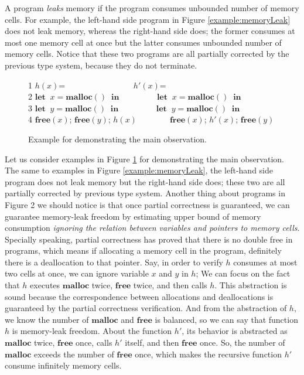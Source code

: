 \documentclass[english]{jssst_ppl} %
\newcommand\LET{\mathbf{let}\;}
\newcommand\IN{\mathbf{in}\;}
\newcommand\Rtab{\; \; \; \;}
\newcommand\MALLOC{\mathbf{malloc()}\;}
\newcommand\Malloc{\mathbf{malloc}}
\newcommand\Free{\mathbf{free}}
\newcommand\Cirx{(x)}
\newcommand\dtb{\;\;\ \;\;\ \;\;\ \;\;\  }
\begin{document}
A program \emph{leaks} memory if the program consumes unbounded number of memory cells. For example, the left-hand side program in Figure \ref{example:memoryLeak} does not leak memory, whereas the right-hand side does; the former consumes at most one memory cell at once but the latter consumes unbounded number of memory cells. Notice that these two programs are all partially corrected by the previous type system, because they do not terminate.
\begin{figure}[h]
1 \;\; $h(x)$=\dtb\dtb\dtb\dtb\Rtab$h'(x)$=\\
2 \;\; $\LET \; x = \MALLOC  \; \IN$\dtb\dtb\Rtab\;$\LET \; x = \MALLOC \; \IN$ \\
3 \;\; $\LET \; y = \MALLOC  \; \IN$\dtb\dtb\Rtab\;$\LET \; y = \MALLOC \; \IN$\\
4 \;\; $\Free\Cirx$; \; $\Free(y) $; \; $h(x)$\dtb\dtb\;\;\;\;$\Free(x)$; $h'(x)$; $\Free(y)$
\caption{Example for demonstrating the main observation.}
\label{example:observation}
\end{figure}

Let us consider examples in Figure \ref{example:observation} for demonstrating the main observation. The same to examples in Figure \ref{example:memoryLeak}, the left-hand side program does not leak memory but the right-hand side does; these two are all partially corrected by previous type system. Another thing about programs in Figure 2 we should notice is that once partial correctness is guaranteed, we can guarantee memory-leak freedom by estimating upper bound of memory consumption \emph{ignoring the relation between variables and pointers to memory cells}. Specially speaking, partial correctness has proved that there is no double free in programs, which means if allocating a memory cell in the program, definitely there is a deallocation to that pointer. Say, in order to verify $h$ consumes at most two cells at once, we can ignore variable $x$ and $y$ in $h$; We can focus on the fact that $h$ executes $\Malloc$ twice, $\Free$ twice, and then calls $h$. This abstraction is sound because the correspondence between allocations and deallocations is guaranteed by the partial correctness verification. And from the abstraction of $h$, we know the number of $\Malloc$ and $\Free$ is balanced, so we can say that function $h$ is memory-leak freedom. About the function $h'$, its behavior is abstracted as $\Malloc$ twice, $\Free$ once, calls $h'$ itself, and then $\Free$ once. So, the number of $\Malloc$ exceeds the number of $\Free$ once, which makes the recursive function $h'$ consume infinitely memory cells.
\end{document}
